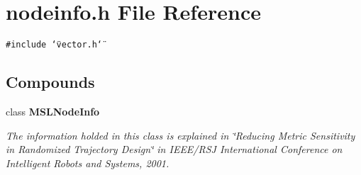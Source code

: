 \section{nodeinfo.h File Reference}
\label{nodeinfo_8h}
{\tt \#include \char`\"{}vector.h\char`\"{}}\par
\subsection*{Compounds}
\begin{CompactItemize}
\item 
class {\bf MSLNode\-Info}
\begin{CompactList}\small\item\em The information holded in this class is explained in \char`\"{}Reducing Metric Sensitivity in Randomized Trajectory Design\char`\"{} in IEEE/RSJ International Conference on Intelligent Robots and Systems, 2001.\item\end{CompactList}\end{CompactItemize}
